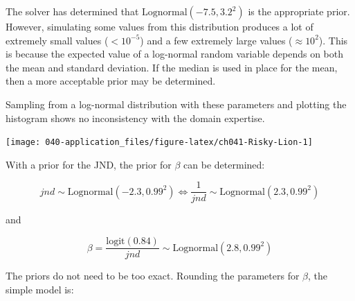 \documentclass[11pt, oneside, openany]{scrbook}
\newenvironment{Shaded}{\begin{snugshade}}{\end{snugshade}}
\newcommand{\CommentTok}[1]{\textcolor[rgb]{0.56,0.35,0.01}{\textit{#1}}}
\newcommand{\DataTypeTok}[1]{\textcolor[rgb]{0.13,0.29,0.53}{#1}}
\newcommand{\DecValTok}[1]{\textcolor[rgb]{0.00,0.00,0.81}{#1}}
\newcommand{\KeywordTok}[1]{\textcolor[rgb]{0.13,0.29,0.53}{\textbf{#1}}}
\newcommand{\NormalTok}[1]{#1}
\newcommand{\OperatorTok}[1]{\textcolor[rgb]{0.81,0.36,0.00}{\textbf{#1}}}
\newcommand{\StringTok}[1]{\textcolor[rgb]{0.31,0.60,0.02}{#1}}
\begin{document}

The solver has determined that \(\mathrm{Lognormal}(-7.5, 3.2^2)\) is the appropriate prior. However, simulating some values from this distribution produces a lot of extremely small values (\(<10^{-5}\)) and a few extremely large values (\(\approx 10^2\)). This is because the expected value of a log-normal random variable depends on both the mean and standard deviation. If the median is used in place for the mean, then a more acceptable prior may be determined.


\begin{Shaded}
\end{Shaded}


Sampling from a log-normal distribution with these parameters and plotting the histogram shows no inconsistency with the domain expertise.

\begin{center}\texttt{[image: 040-application\_files/figure-latex/ch041-Risky-Lion-1]} \end{center}

With a prior for the JND, the prior for \(\beta\) can be determined:


\[
jnd \sim \mathrm{Lognormal}(-2.3, 0.99^2) \Longleftrightarrow \frac{1}{jnd} \sim \mathrm{Lognormal}(2.3, 0.99^2)
\]

and

\[
\beta = \frac{\mathrm{logit}(0.84)}{jnd} \sim \mathrm{Lognormal}(2.8, 0.99^2)
\]

The priors do not need to be too exact. Rounding the parameters for \(\beta\), the simple model is:
\end{document}
